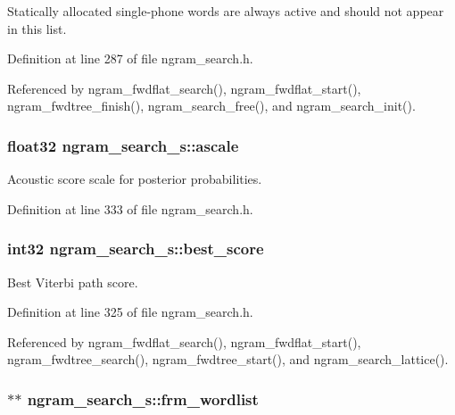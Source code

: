 Statically allocated single-\/phone words are always active and should not appear in this list. 

Definition at line 287 of file ngram\+\_\+search.\+h.



Referenced by ngram\+\_\+fwdflat\+\_\+search(), ngram\+\_\+fwdflat\+\_\+start(), ngram\+\_\+fwdtree\+\_\+finish(), ngram\+\_\+search\+\_\+free(), and ngram\+\_\+search\+\_\+init().

\subsubsection[{ascale}]{\setlength{\rightskip}{0pt plus 5cm}float32 ngram\+\_\+search\+\_\+s\+::ascale}\label{structngram__search__s_a1e3d4b67e4b11c6c11ebe16552d53d2d}


Acoustic score scale for posterior probabilities. 



Definition at line 333 of file ngram\+\_\+search.\+h.

\subsubsection[{best\+\_\+score}]{\setlength{\rightskip}{0pt plus 5cm}int32 ngram\+\_\+search\+\_\+s\+::best\+\_\+score}\label{structngram__search__s_a150d99157e2f37a6f0dbb4b02682d9c3}


Best Viterbi path score. 



Definition at line 325 of file ngram\+\_\+search.\+h.



Referenced by ngram\+\_\+fwdflat\+\_\+search(), ngram\+\_\+fwdflat\+\_\+start(), ngram\+\_\+fwdtree\+\_\+search(), ngram\+\_\+fwdtree\+\_\+start(), and ngram\+\_\+search\+\_\+lattice().

\subsubsection[{frm\+\_\+wordlist}]{$\ast$$\ast$ ngram\+\_\+search\+\_\+s\+::frm\+\_\+wordlist}\label{structngram__search__s_aa54544457c363ccccb87fc7ec63a5f3e}


